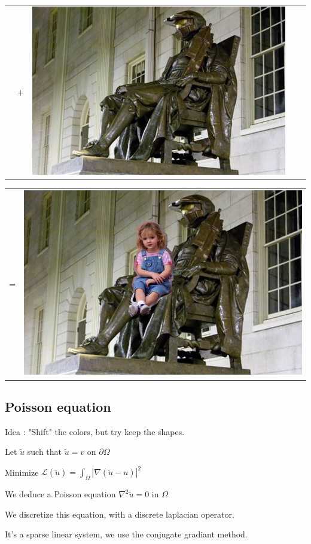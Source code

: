 \documentclass{beamer}
\begin{document}
\begin{frame}
\begin{center}
\begin{tabular}{m{1.6cm}m{.6cm}m{1.6cm}m{.6cm}m{4.7cm}}
      & {\Huge$+$} &
      \includegraphics[scale=.2]{results_poisson/background.png}
    \end{tabular}
    \par\medskip
    \begin{tabular}{m{.6cm}m{4.7cm}}
      {\Huge=} &
      \includegraphics[scale=.2]{results_poisson/naive.png}
    \end{tabular}
  \end{center}
\end{frame}

\subsection{Poisson equation}

\begin{frame}
  Idea : "Shift" the colors, but try keep the shapes.
  
  \medskip Let $\tilde u$ such that $\tilde u = v$ on $\partial\Omega$
  
  \medskip Minimize $\mathcal L(\tilde u) = \int_\Omega |\nabla(\tilde u - u)|^2$
  
  \medskip We deduce a Poisson equation $\nabla^2 \tilde u = 0$ in $\Omega$
  
  \medskip We discretize this equation, with a discrete laplacian operator.
  
  \medskip It's a sparse linear system, we use the conjugate gradiant method.
\end{frame}
\end{document}
